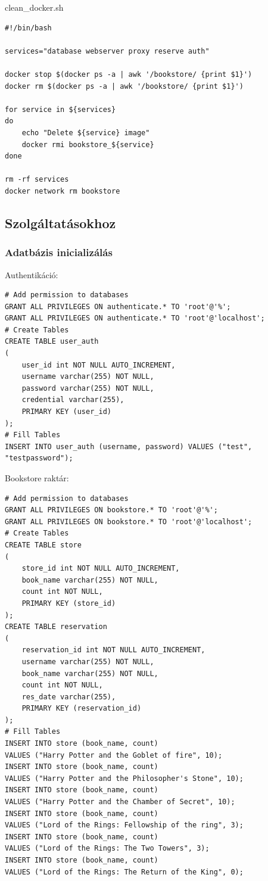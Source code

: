 \documentclass[11pt,magyar,a4paper,oneside,]{report}
\begin{document}
clean\_docker.sh

\begin{verbatim}
#!/bin/bash

services="database webserver proxy reserve auth"

docker stop $(docker ps -a | awk '/bookstore/ {print $1}')
docker rm $(docker ps -a | awk '/bookstore/ {print $1}')

for service in ${services}
do
    echo "Delete ${service} image"
    docker rmi bookstore_${service}
done

rm -rf services
docker network rm bookstore
\end{verbatim}

\subsection{Szolgáltatásokhoz}\label{szolguxe1ltatuxe1sokhoz}

\subsubsection{Adatbázis
inicializálás}\label{adatbuxe1zis-inicializuxe1luxe1s}

Authentikáció:

\begin{verbatim}
# Add permission to databases
GRANT ALL PRIVILEGES ON authenticate.* TO 'root'@'%';
GRANT ALL PRIVILEGES ON authenticate.* TO 'root'@'localhost';
# Create Tables
CREATE TABLE user_auth
(
    user_id int NOT NULL AUTO_INCREMENT,
    username varchar(255) NOT NULL,
    password varchar(255) NOT NULL,
    credential varchar(255),
    PRIMARY KEY (user_id)
);
# Fill Tables
INSERT INTO user_auth (username, password) VALUES ("test", "testpassword");
\end{verbatim}

Bookstore raktár:

\begin{verbatim}
# Add permission to databases
GRANT ALL PRIVILEGES ON bookstore.* TO 'root'@'%';
GRANT ALL PRIVILEGES ON bookstore.* TO 'root'@'localhost';
# Create Tables
CREATE TABLE store
(
    store_id int NOT NULL AUTO_INCREMENT,
    book_name varchar(255) NOT NULL,
    count int NOT NULL,
    PRIMARY KEY (store_id)
);
CREATE TABLE reservation
(
    reservation_id int NOT NULL AUTO_INCREMENT,
    username varchar(255) NOT NULL,
    book_name varchar(255) NOT NULL,
    count int NOT NULL,
    res_date varchar(255),
    PRIMARY KEY (reservation_id)
);
# Fill Tables
INSERT INTO store (book_name, count)
VALUES ("Harry Potter and the Goblet of fire", 10);
INSERT INTO store (book_name, count)
VALUES ("Harry Potter and the Philosopher's Stone", 10);
INSERT INTO store (book_name, count)
VALUES ("Harry Potter and the Chamber of Secret", 10);
INSERT INTO store (book_name, count)
VALUES ("Lord of the Rings: Fellowship of the ring", 3);
INSERT INTO store (book_name, count)
VALUES ("Lord of the Rings: The Two Towers", 3);
INSERT INTO store (book_name, count)
VALUES ("Lord of the Rings: The Return of the King", 0);
\end{verbatim}
\end{document}
